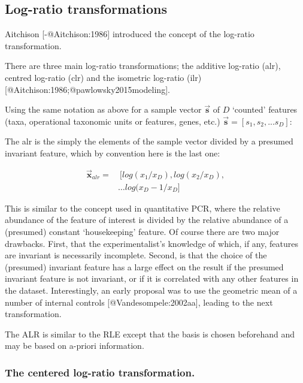 \documentclass[
  onecolumn]{article}
\begin{document}
\hypertarget{log-ratio-transformations}{%
\subsection{Log-ratio transformations}\label{log-ratio-transformations}}

Aitchison {[}-@Aitchison:1986{]} introduced the concept of the log-ratio transformation.

There are three main log-ratio transformations; the additive log-ratio (alr), centred log-ratio (clr) and the isometric log-ratio (ilr) {[}@Aitchison:1986;@pawlowsky2015modeling{]}.

Using the same notation as above for a sample vector \(\vec{\textbf{s}}\) of \(D\) `counted' features (taxa, operational taxonomic units or features, genes, etc.) \(\vec{\textbf{s}}=[s_1, s_2, ... s_D]\):

The alr is the simply the elements of the sample vector divided by a presumed invariant feature, which by convention here is the last one:

\begin{equation}
\begin{aligned}
 \vec{\textbf{x}}_{alr}= &\ [log(x_1/x_D), log(x_2/x_D), \\
 & \ldots log(x_D-1/x_D]
\end{aligned}
 \label{eq:alr}
\end{equation}

This is similar to the concept used in quantitative PCR, where the relative abundance of the feature of interest is divided by the relative abundance of a (presumed) constant `housekeeping' feature. Of course there are two major drawbacks. First, that the experimentalist's knowledge of which, if any, features are invariant is necessarily incomplete. Second, is that the choice of the (presumed) invariant feature has a large effect on the result if the presumed invariant feature is not invariant, or if it is correlated with any other features in the dataset. Interestingly, an early proposal was to use the geometric mean of a number of internal controls {[}@Vandesompele:2002aa{]}, leading to the next transformation.

The ALR is similar to the RLE except that the basis is chosen beforehand and may be based on a-priori information.

\hypertarget{the-centered-log-ratio-transformation.}{%
\subsubsection{The centered log-ratio transformation.}\label{the-centered-log-ratio-transformation.}}
\end{document}
